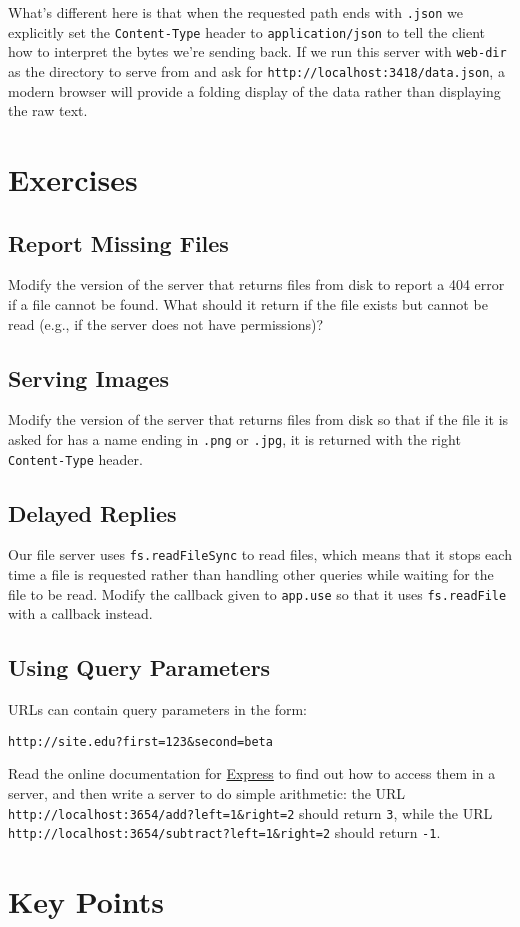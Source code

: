 What's different here is that when the requested path ends with \texttt{.json}
we explicitly set the \texttt{Content-Type} header to \texttt{application/json}
to tell the client how to interpret the bytes we're sending back.
If we run this server with \texttt{web-dir} as the directory to serve from
and ask for \texttt{http://localhost:3418/data.json},
a modern browser will provide a folding display of the data
rather than displaying the raw text.

\section{Exercises}\label{s:server-exercises}

\subsection*{Report Missing Files}
Modify the version of the server that returns files from disk
to report a 404 error if a file cannot be found.
What should it return if the file exists but cannot be read
(e.g., if the server does not have permissions)?

\subsection*{Serving Images}
Modify the version of the server that returns files from disk
so that if the file it is asked for has a name ending in \texttt{.png} or \texttt{.jpg},
it is returned with the right \texttt{Content-Type} header.

\subsection*{Delayed Replies}
Our file server uses \texttt{fs.readFileSync} to read files,
which means that it stops each time a file is requested
rather than handling other queries while waiting for the file to be read.
Modify the callback given to \texttt{app.use} so that it uses \texttt{fs.readFile} with a callback instead.

\subsection*{Using Query Parameters}
URLs can contain query parameters in the form:

\begin{verbatim}
http://site.edu?first=123&second=beta
\end{verbatim}

\noindent
Read the online documentation for \href{https://expressjs.org/}{Express} to find out
how to access them in a server,
and then write a server to do simple arithmetic:
the URL \texttt{http://localhost:3654/add?left=1\&right=2} should return \texttt{3},
while the URL \texttt{http://localhost:3654/subtract?left=1\&right=2} should return \texttt{-1}.

\section*{Key Points}


